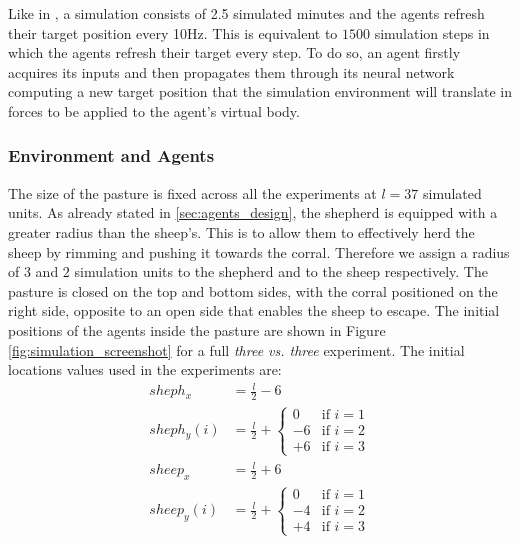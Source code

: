 \documentclass[conference]{IEEEtran}
\begin{document}
Like in \cite{potter2001heterogeneity}, a simulation consists of 2.5 simulated minutes and the agents refresh their target position every 10Hz.
This is equivalent to $1500$ simulation steps in which the agents refresh their target every step.
To do so, an agent firstly acquires its inputs and then propagates them through its neural network computing a new target position that the simulation environment will translate in forces to be applied to the agent's virtual body.



\subsubsection{Environment and Agents}
The size of the pasture is fixed across all the experiments at $l = 37$ simulated units.
As already stated in \ref{sec:agents_design}, the shepherd is equipped with a greater radius than the sheep's.
This is to allow them to effectively herd the sheep by rimming and pushing it towards the corral.
Therefore we assign a radius of $3$ and $2$ simulation units to the shepherd and to the sheep respectively.
The pasture is closed on the top and bottom sides, with the corral positioned on the right side, opposite to an open side that enables the sheep to escape.
The initial positions of the agents inside the pasture are shown in Figure \ref{fig:simulation_screenshot} for a full \textit{three vs. three} experiment.
The initial locations values used in the experiments are:
\begin{align}
sheph_x &= \frac{l}{2} - 6 \\
sheph_y(i) &= \frac{l}{2} + \begin{cases} 0 & \text{if } i=1 \\ -6 & \text{if } i=2 \\ +6 & \text{if } i=3 \end{cases} \\
sheep_x &= \frac{l}{2} + 6 \\
sheep_y(i) &= \frac{l}{2} + \begin{cases} 0 & \text{if } i=1 \\ -4 & \text{if } i=2 \\ +4 & \text{if } i=3 \end{cases}
\end{align}
\end{document}
